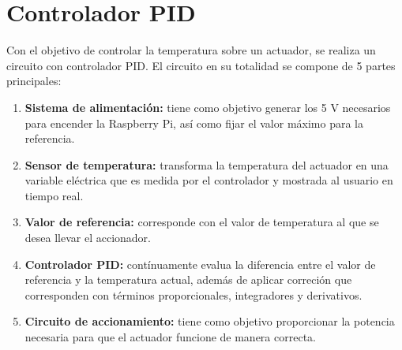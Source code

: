 \documentclass{wileysix}
\begin{document}
\subtitle{Electr\'onica para Ciencias}

\halftitlepage
\titlepage



\tableofcontents
\chapter{Controlador PID}

Con el objetivo de controlar la temperatura sobre un actuador, se realiza un circuito con controlador PID. El circuito en su totalidad se compone de 5 partes principales:
\begin{enumerate}
	\item \textbf{Sistema de alimentaci\'on:} tiene como objetivo generar los 5 V necesarios para encender la Raspberry Pi, as\'i como fijar el valor m\'aximo para la referencia.
	\item \textbf{Sensor de temperatura:} transforma la temperatura del actuador en una variable el\'ectrica que es medida por el controlador y mostrada al usuario en tiempo real. 
	\item \textbf{Valor de referencia:} corresponde con el valor de temperatura al que se desea llevar el accionador.
	\item \textbf{Controlador PID:} cont\'inuamente evalua la diferencia entre el valor de referencia y la temperatura actual, adem\'as de aplicar correci\'on que corresponden con t\'erminos proporcionales, integradores y derivativos.
	\item \textbf{Circuito de accionamiento:} tiene como objetivo proporcionar la potencia necesaria para que el actuador funcione de manera correcta.
\end{enumerate}
\end{document}
